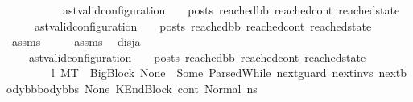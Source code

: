 \begin{isabellebody}
\ \ \ \ \ \ \ \ \ \ {\isacharparenleft}{\kern0pt}ast{\isacharunderscore}{\kern0pt}valid{\isacharunderscore}{\kern0pt}configuration\ {\isasymLambda}\ {\isasymGamma}\ {\isasymOmega}\ posts\ reached{\isacharunderscore}{\kern0pt}bb\ reached{\isacharunderscore}{\kern0pt}cont\ reached{\isacharunderscore}{\kern0pt}state{\isacharparenright}{\kern0pt}{\isachardoublequoteclose}\isanewline
\ \ \ \ \ {\isachardoublequoteopen}{\isacharparenleft}{\kern0pt}ast{\isacharunderscore}{\kern0pt}valid{\isacharunderscore}{\kern0pt}configuration\ {\isasymLambda}\ {\isasymGamma}\ {\isasymOmega}\ posts\ reached{\isacharunderscore}{\kern0pt}bb\ reached{\isacharunderscore}{\kern0pt}cont\ reached{\isacharunderscore}{\kern0pt}state{\isacharparenright}{\kern0pt}{\isachardoublequoteclose}\isanewline
%
\isadelimproof
\ \ %
\endisadelimproof
%
\isatagproof
{}\isamarkupfalse%
\ assms\isanewline
{}\isamarkupfalse%
\ {\isacharminus}{\kern0pt}\isanewline
\ \ \isamarkupfalse%
\ assms{\isacharparenleft}{\kern0pt}{}{\isacharminus}{\kern0pt}{}{\isacharparenright}{\kern0pt}\ \isamarkupfalse%
\ disj{\isacharunderscore}{\kern0pt}a{\isacharcolon}{\kern0pt}\isanewline
\ \ \ \ {\isachardoublequoteopen}{\isacharparenleft}{\kern0pt}ast{\isacharunderscore}{\kern0pt}valid{\isacharunderscore}{\kern0pt}configuration\ {\isasymLambda}\ {\isasymGamma}\ {\isasymOmega}\ posts\ reached{\isacharunderscore}{\kern0pt}bb\ reached{\isacharunderscore}{\kern0pt}cont\ reached{\isacharunderscore}{\kern0pt}state{\isacharparenright}{\kern0pt}\ {\isasymor}\ \isanewline
\ \ \ \ \ \ \ {\isacharparenleft}{\kern0pt}{\isasymexists}\ l{}{\isachardot}{\kern0pt}\ {\isacharparenleft}{\kern0pt}M{\isacharcomma}{\kern0pt}{\isasymLambda}{\isacharcomma}{\kern0pt}{\isasymGamma}{\isacharcomma}{\kern0pt}{\isasymOmega}{\isacharcomma}{\kern0pt}T\ {\isasymturnstile}\ {\isacharparenleft}{\kern0pt}{\isacharparenleft}{\kern0pt}BigBlock\ None\ {\isacharbrackleft}{\kern0pt}{\isacharbrackright}{\kern0pt}\ {\isacharparenleft}{\kern0pt}Some\ {\isacharparenleft}{\kern0pt}ParsedWhile\ next{\isacharunderscore}{\kern0pt}guard\ next{\isacharunderscore}{\kern0pt}invs\ {\isacharparenleft}{\kern0pt}next{\isacharunderscore}{\kern0pt}body{\isacharunderscore}{\kern0pt}bb{\isacharhash}{\kern0pt}body{\isacharunderscore}{\kern0pt}bbs{\isacharparenright}{\kern0pt}{\isacharparenright}{\kern0pt}{\isacharparenright}{\kern0pt}\ None{\isacharparenright}{\kern0pt}{\isacharcomma}{\kern0pt}\ KEndBlock\ cont{}{\isacharcomma}{\kern0pt}\ Normal\ ns{}{\isacharprime}{\kern0pt}{\isacharprime}{\kern0pt}{\isacharparenright}{\kern0pt}\ \isanewline

\end{isabellebody}
